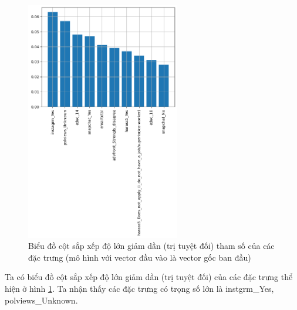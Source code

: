 \begin{enumerate}[label=(\alph*)]
    \begin{figure}[H]
        \centering
        \includegraphics[width=0.6\textwidth]{figures/Thanh/Models/XGBoost/Non_null_models_Feature_Importance_XGBoost_original_features.png}
        \caption{Biểu đồ cột sắp xếp độ lớn giảm dần (trị tuyệt đối) tham số của các đặc trưng (mô hình với vector đầu vào là vector gốc ban đầu)}
        \label{fig:Non_null_models_Feature_Importance_XGBoost_original_features}
    \end{figure}
    
    Ta có biểu đồ cột sắp xếp độ lớn giảm dần (trị tuyệt đối) của các đặc trưng thể hiện ở hình \ref{fig:Non_null_models_Feature_Importance_XGBoost_original_features}.
    Ta nhận thấy các đặc trưng có trọng số lớn là instgrm\_Yes, polviews\_Unknown.
\end{enumerate}